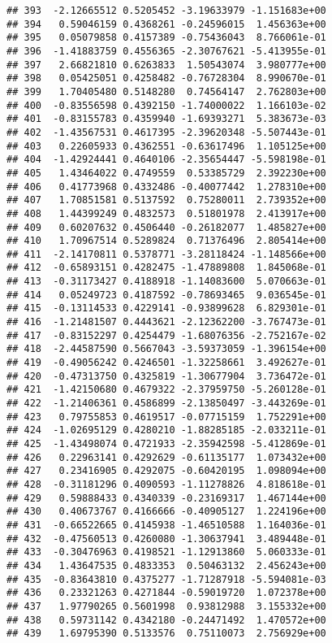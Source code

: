 \documentclass[
]{article}
\begin{document}
\begin{verbatim}
## 393  -2.12665512 0.5205452 -3.19633979 -1.151683e+00
## 394   0.59046159 0.4368261 -0.24596015  1.456363e+00
## 395   0.05079858 0.4157389 -0.75436043  8.766061e-01
## 396  -1.41883759 0.4556365 -2.30767621 -5.413955e-01
## 397   2.66821810 0.6263833  1.50543074  3.980777e+00
## 398   0.05425051 0.4258482 -0.76728304  8.990670e-01
## 399   1.70405480 0.5148280  0.74564147  2.762803e+00
## 400  -0.83556598 0.4392150 -1.74000022  1.166103e-02
## 401  -0.83155783 0.4359940 -1.69393271  5.383673e-03
## 402  -1.43567531 0.4617395 -2.39620348 -5.507443e-01
## 403   0.22605933 0.4362551 -0.63617496  1.105125e+00
## 404  -1.42924441 0.4640106 -2.35654447 -5.598198e-01
## 405   1.43464022 0.4749559  0.53385729  2.392230e+00
## 406   0.41773968 0.4332486 -0.40077442  1.278310e+00
## 407   1.70851581 0.5137592  0.75280011  2.739352e+00
## 408   1.44399249 0.4832573  0.51801978  2.413917e+00
## 409   0.60207632 0.4506440 -0.26182077  1.485827e+00
## 410   1.70967514 0.5289824  0.71376496  2.805414e+00
## 411  -2.14170811 0.5378771 -3.28118424 -1.148566e+00
## 412  -0.65893151 0.4282475 -1.47889808  1.845068e-01
## 413  -0.31173427 0.4188918 -1.14083600  5.070663e-01
## 414   0.05249723 0.4187592 -0.78693465  9.036545e-01
## 415  -0.13114533 0.4229141 -0.93899628  6.829301e-01
## 416  -1.21481507 0.4443621 -2.12362200 -3.767473e-01
## 417  -0.83152297 0.4254479 -1.68076356 -2.752167e-02
## 418  -2.44587590 0.5667043 -3.59373059 -1.396154e+00
## 419  -0.49056242 0.4246501 -1.32258661  3.492627e-01
## 420  -0.47313750 0.4325819 -1.30677904  3.736472e-01
## 421  -1.42150680 0.4679322 -2.37959750 -5.260128e-01
## 422  -1.21406361 0.4586899 -2.13850497 -3.443269e-01
## 423   0.79755853 0.4619517 -0.07715159  1.752291e+00
## 424  -1.02695129 0.4280210 -1.88285185 -2.033211e-01
## 425  -1.43498074 0.4721933 -2.35942598 -5.412869e-01
## 426   0.22963141 0.4292629 -0.61135177  1.073432e+00
## 427   0.23416905 0.4292075 -0.60420195  1.098094e+00
## 428  -0.31181296 0.4090593 -1.11278826  4.818618e-01
## 429   0.59888433 0.4340339 -0.23169317  1.467144e+00
## 430   0.40673767 0.4166666 -0.40905127  1.224196e+00
## 431  -0.66522665 0.4145938 -1.46510588  1.164036e-01
## 432  -0.47560513 0.4260080 -1.30637941  3.489448e-01
## 433  -0.30476963 0.4198521 -1.12913860  5.060333e-01
## 434   1.43647535 0.4833353  0.50463132  2.456243e+00
## 435  -0.83643810 0.4375277 -1.71287918 -5.594081e-03
## 436   0.23321263 0.4271844 -0.59019720  1.072378e+00
## 437   1.97790265 0.5601998  0.93812988  3.155332e+00
## 438   0.59731142 0.4342180 -0.24471492  1.470572e+00
## 439   1.69795390 0.5133576  0.75110073  2.756929e+00

\end{verbatim}
\end{document}
